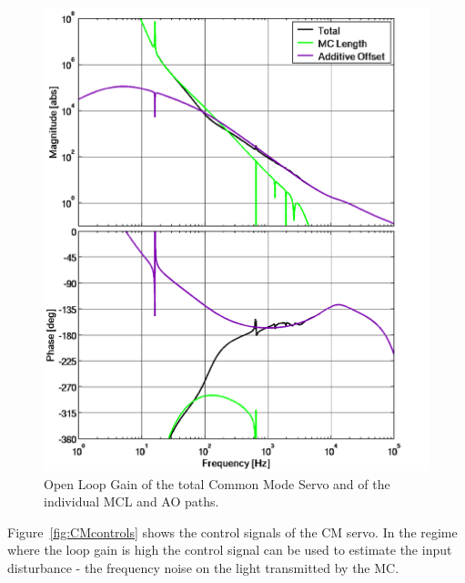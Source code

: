 \begin{figure}[!h]
\centerline{\includegraphics[angle=0,width=6.5in]{Figures/Chap5/CM-Loops.png}}
\caption[CM Loops]{Open Loop Gain of the total Common Mode Servo and of the
                   individual MCL and AO paths.}
\label{fig:CMbode}
\end{figure}


Figure~\ref{fig:CMcontrols} shows the control signals of the CM servo. In the
regime where the loop gain is high the control signal can be used to estimate
the input disturbance - the frequency noise on the light transmitted by the
MC.


